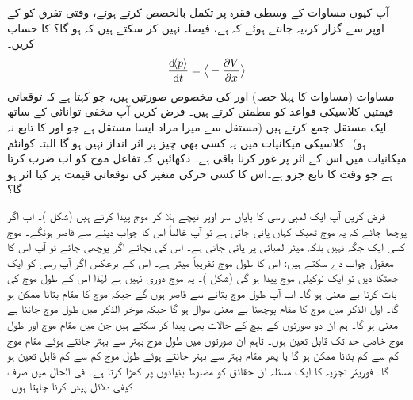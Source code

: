 آپ کیوں مساوات  کے وسطی فقرہ پر تکمل بالحصص کرتے ہوئے، وقتی تفرق کو  کے اوپر سے گزار کر،یہ جانتے ہوئے کہ  ہے، فیصلہ نہیں کر سکتے ہیں کہ  ہو گا؟
 کا حساب کریں۔
\begin{align}\label{مساوات_تفاعل_موج_مخفی_توانائی_سے_معیار_حرکت}
\frac{\dif\langle p \rangle}{\dif t}=\big\langle-\frac{\partial V}{\partial x} \big\rangle
\end{align}
مساوات  (مساوات  کا پہلا حصہ) اور   کی مخصوص صورتیں ہیں، جو کہتا ہے کہ توقعاتی قیمتیں کلاسیکی قواعد کو مطمئن کرتے ہیں۔
فرض کریں آپ مخفی توانائی کے ساتھ ایک مستقل جمع کرتے ہیں (مستقل سے میرا مراد ایسا مستقل ہے  جو  اور  کا تابع نہ ہو)۔ کلاسیکی میکانیات میں یہ کسی بھی چیز پر اثر انداز نہیں ہو گا البتہ کوانٹم میکانیات میں اس کے اثر پر غور کرنا باقی ہے۔ دکھائیں کہ تفاعل موج کو اب  ضرب کرتا ہے جو وقت کا تابع جزو ہے۔اس کا کسی حرکی متغیر کی توقعاتی قیمت پر کیا اثر ہو گا؟ 

فرض کریں آپ ایک لمبی رسی کا  بایاں  سر اوپر نیچے  ہلا کر موج پیدا کرتے ہیں (شکل )۔ اب اگر پوچھا جائے کہ یہ موج ٹھیک  کہاں پائی جاتی ہے تو آپ غالباً اس کا جواب دینے سے قاصر ہونگے۔ موج کسی ایک جگہ نہیں بلکہ    میٹر لمبائی پر پائی جاتی ہے۔ اس کی بجائے اگر   پوچھی جائے  تو آپ اس کا معقول جواب دے سکتے ہیں:  اس کا طول موج تقریباً      میٹر ہے۔ اس کے برعکس اگر آپ رسی کو ایک جھٹکا دیں تو  ایک نوکیلی موج پیدا ہو گی (شکل )۔ یہ موج دوری نہیں ہے لہٰذا اس کے طول موج کی بات کرنا بے معنی ہو گا۔ اب آپ طول موج بتانے سے قاصر ہوں گے جبکہ  موج کا مقام بتانا ممکن ہو گا۔ اول الذکر  میں موج کا مقام پوچھنا بے معنی سوال ہو گا جبکہ موخر الذکر میں طول موج جاننا بے معنی  ہو گا۔ ہم ان دو صورتوں کے بیچ کے حالات بھی پیدا کر سکتے ہیں  جن میں  مقام موج   اور  طول موج خاصی حد تک قابل تعین ہوں۔ تاہم ان صورتوں میں طول موج بہتر سے بہتر جانتے ہوئے مقام موج کم سے کم بتانا ممکن ہو گا یا پھر مقام بہتر سے بہتر جانتے ہوئے طول موج کم سے کم قابل تعین  ہو گا۔ فوریئر تجزیہ کا ایک مسئلہ ان حقائق کو مضبوط بنیادوں پر کھڑا کرتا ہے۔ فی الحال میں صرف کیفی دلائل پیش کرنا چاہتا ہوں۔

